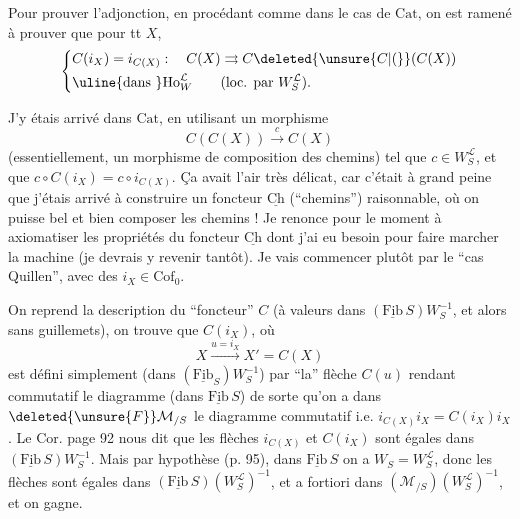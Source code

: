 Pour prouver l'adjonction, en procédant comme dans le cas de $\mathrm{Cat}$, on est ramené à prouver que pour tt $X$,
\[
\left\{\begin{aligned}
&C(i_X)=i_{C(X)}:\quad C(X)\rightrightarrows C\deleted{\unsure{C|(}}(C(X))\\
&\text{\uline{dans }}\mathrm{Ho}^{\mathcal L}_W\qquad(\text{loc. par }W_S^{\mathcal L})\text{.}
\end{aligned}\right.
\]

J'y étais arrivé dans $\mathrm{Cat}$, en utilisant un morphisme
\[
C(C(X))\xrightarrow{c}C(X)
\]
(essentiellement, un morphisme de composition des chemins) tel que $c\in W_S^{\mathcal L}$, et que $c\circ C(i_X)=c\circ i_{C(X)}$. Ça avait l'air très délicat, car c'était à grand peine que j'étais arrivé à construire un foncteur $\underline{\mathrm{Ch}}$ (``chemins'') \unsure{,} raisonnable, où on puisse bel et bien composer les chemins ! Je renonce pour le moment à axiomatiser les propriétés du foncteur $\underline{\mathrm{Ch}}$ dont j'ai eu besoin pour faire marcher la machine (je devrais y revenir tantôt).
Je vais commencer plutôt par le ``cas Quillen'', avec des $i_X\in\mathrm{Cof}_0$.

On reprend la description du ``foncteur'' $C$ (à valeurs dans $(\underline{\mathrm{Fib}}\,S)W_S^{-1}$, et alors sans guillemets), on trouve que $C(i_X)$, où
\[
X\xrightarrow{u=i_X}X'=C(X)
\]
est défini simplement (dans $(\underline{\mathrm{Fib}}_S)W_S^{-1}$) par ``la'' flèche $C(u)$ rendant commutatif le diagramme (dans $\underline{\mathrm{Fib}}\,S$)
de sorte qu'on a dans $\deleted{\unsure{F}}\mathcal M_{/S}$ le diagramme
commutatif i.e. $i_{C(X)}i_X=C(i_X)i_X$. Le Cor. page 92 nous dit que les flèches $i_{C(X)}$ et $C(i_X)$ sont égales dans $(\underline{\mathrm{Fib}}\,S)W_S^{-1}$.
Mais par hypothèse (p. 95), dans $\underline{\mathrm{Fib}}\,S$ on a $W_S=W_S^{\mathcal L}$, donc les flèches sont égales dans $(\underline{\mathrm{Fib}}\,S)(W_S^{\mathcal L})^{-1}$, et a fortiori dans $(\mathcal M_{/S})(W_S^{\mathcal L})^{-1}$, et on gagne.


